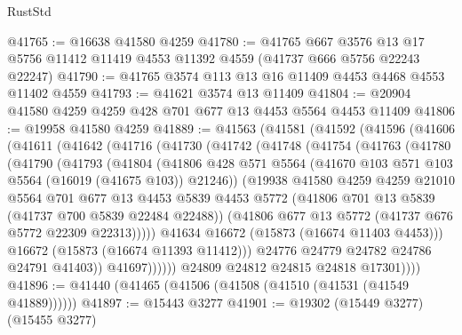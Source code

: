 \begin{lexlean}{RustStd}
\begin{coremodule}
@41765 := @16638 @41580 @4259
@41780 := @41765
    @667
    @3576
    @13
    @17
    @5756
    @11412
    @11419
    @4553
    @11392
    @4559
    (@41737 @666 @5756 @22243 @22247)
@41790 := @41765 @3574 @113 @13 @16 @11409 @4453 @4468 @4553 @11402 @4559
@41793 := @41621 @3574 @13 @11409
@41804 := @20904 @41580 @4259 @4259 @428 @701 @677 @13 @4453 @5564 @4453 @11409
@41806 := @19958 @41580 @4259
@41889 := @41563
    (@41581
      (@41592
        (@41596
          (@41606
            (@41611
              (@41642
                (@41716
                  (@41730
                    (@41742
                      (@41748
                        (@41754
                          (@41763
                            (@41780
                              (@41790
                                (@41793
                                  (@41804
                                    (@41806
                                      @428
                                      @571
                                      @5564
                                      (@41670 @103 @571 @103 @5564 (@16019 (@41675 @103)) @21246))
                                    (@19938
                                      @41580
                                      @4259
                                      @4259
                                      @21010
                                      @5564
                                      @701
                                      @677
                                      @13
                                      @4453
                                      @5839
                                      @4453
                                      @5772
                                      (@41806 @701 @13 @5839 (@41737 @700 @5839 @22484 @22488))
                                      (@41806 @677 @13 @5772 (@41737 @676 @5772 @22309 @22313)))))
                                @41634
                                @16672
                                (@15873 (@16674 @11403 @4453)))
                              @16672
                              (@15873 (@16674 @11393 @11412)))
                            @24776
                            @24779
                            @24782
                            @24786
                            @24791
                            @41403))
                        @41697))))))
            @24809
            @24812
            @24815
            @24818
            @17301))))
@41896 := @41440 (@41465 (@41506 (@41508 (@41510 (@41531 (@41549 @41889))))))
@41897 := @15443 @3277
@41901 := @19302 (@15449 @3277) (@15455 @3277)

\end{coremodule}
\end{lexlean}
